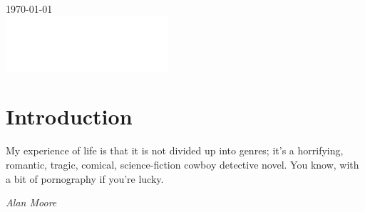 \documentclass[11pt,a4paper]{article}
\begin{document}
\begin{titlepage}
{\large \today}\\[2cm] %

\vfill %
\includegraphics[width=60mm]{LiU_logo.PNG} %

\end{titlepage}

\pagecolor{none}
\color{black}
\begin{abstract}
    \lipsum[83-84]
\end{abstract}
\newpage

\tableofcontents

\newpage

\renewcommand\thetable{\thesection.\arabic{table}}
\renewcommand\thefigure{\thesection.\arabic{figure}}    
\setcounter{figure}{0}  

\section{Introduction}

\epigraph{My experience of life is that it is not divided up into genres; it’s a horrifying, romantic, tragic, comical, science-fiction cowboy detective novel. You know, with a bit of pornography if you're lucky.}{\textit{Alan Moore}}
\end{document}
